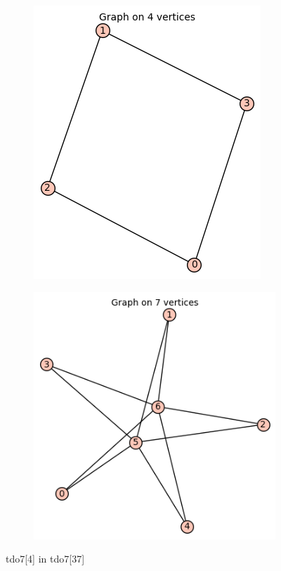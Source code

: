 \documentclass[12pt, a4paper]{article}
\begin{document}
\begin{center}
\begin{figure}[!htb]
\centering
\begin{subfigure}{0.5\textwidth}
  \centering
  \includegraphics[width=0.35\linewidth]{tdo7[4]}
\end{subfigure}%
\begin{subfigure}{0.5\textwidth}
  \centering
  \includegraphics[width=0.5\linewidth]{tdo7[37]}
\end{subfigure}
\caption{tdo7[4] in tdo7[37]}
\label{fig:test}
\end{figure}


\end{center}
\end{document}
